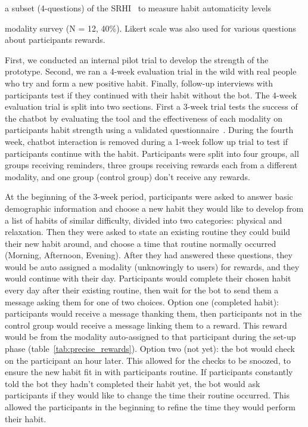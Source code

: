 \documentclass{scaffold/sigchi}
\begin{document}
a subset (4-questions) of the SRHI~\cite{article_habit_strength}  to measure habit automaticity levels

 modality survey (N = 12, 40\%). Likert scale was also used for various questions about participants rewards.
 

First, we conducted an internal pilot trial to develop the strength of the prototype. Second, we ran a 4-week evaluation trial in the wild with real people who try and form a new positive habit. Finally, follow-up interviews with participants test if they continued with their habit without the bot.\newline
\newline
The 4-week evaluation trial is split into two sections. First a 3-week trial tests the success of the chatbot by evaluating the tool and the effectiveness of each modality on participants habit strength using a validated questionnaire~\cite{article_habit_measurement}. During the fourth week, chatbot interaction is removed during a 1-week follow up trial to test if participants continue with the habit. Participants were split into four groups, all groups receiving reminders, three groups receiving rewards each from a different modality, and one group (control group) don't receive any rewards.


At the beginning of the 3-week period, participants were asked to answer basic demographic information and choose a new habit they would like to develop from a list of habits of similar difficulty, divided into two categories: physical and relaxation. Then they were asked to state an existing routine they could build their new habit around, and choose a time that routine normally occurred (Morning, Afternoon, Evening). After they had answered these questions, they would be auto assigned a modality (unknowingly to users) for rewards, and they would continue with their day. Participants would complete their chosen habit every day after their existing routine, then wait for the bot to send them a message asking them for one of two choices.\newline
\newline
Option one (completed habit): participants would receive a message thanking them, then participants not in the control group would receive a message linking them to a reward. This reward would be from the modality auto-assigned to that participant during the set-up phase (table~\ref{tab:precise_rewards}). Option two (not yet): the bot would check on the participant an hour later. This allowed for the checks to be snoozed, to ensure the new habit fit in with participants routine. If participants constantly told the bot they hadn't completed their habit yet, the bot would ask participants if they would like to change the time their routine occurred. This allowed the participants in the beginning to refine the time they would perform their habit.
\end{document}
